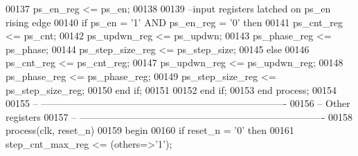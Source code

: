 \begin{DoxyCode}
00137          \textcolor{vhdlchar}{ps_en_reg}            \textcolor{vhdlchar}{<=} \textcolor{vhdlchar}{ps_en};
00138          
00139 \textcolor{keyword}{         --input registers latched on ps\_en rising edge}
00140          \textcolor{keywordflow}{if} \textcolor{vhdlchar}{ps_en} \textcolor{vhdlchar}{=} \textcolor{vhdlchar}{'}\textcolor{vhdllogic}{}\textcolor{vhdllogic}{1}\textcolor{vhdlchar}{'} \textcolor{keywordflow}{AND} \textcolor{vhdlchar}{ps_en_reg} \textcolor{vhdlchar}{=} \textcolor{vhdlchar}{'}\textcolor{vhdllogic}{}\textcolor{vhdllogic}{0}\textcolor{vhdlchar}{'} \textcolor{keywordflow}{then} 
00141             \textcolor{vhdlchar}{ps_cnt_reg}        \textcolor{vhdlchar}{<=} \textcolor{vhdlchar}{ps_cnt};
00142             \textcolor{vhdlchar}{ps_updwn_reg}      \textcolor{vhdlchar}{<=} \textcolor{vhdlchar}{ps_updwn};
00143             \textcolor{vhdlchar}{ps_phase_reg}      \textcolor{vhdlchar}{<=} \textcolor{vhdlchar}{ps_phase};
00144             \textcolor{vhdlchar}{ps_step_size_reg}  \textcolor{vhdlchar}{<=} \textcolor{vhdlchar}{ps_step_size};
00145          \textcolor{keywordflow}{else} 
00146             \textcolor{vhdlchar}{ps_cnt_reg}        \textcolor{vhdlchar}{<=} \textcolor{vhdlchar}{ps_cnt_reg};
00147             \textcolor{vhdlchar}{ps_updwn_reg}      \textcolor{vhdlchar}{<=} \textcolor{vhdlchar}{ps_updwn_reg};
00148             \textcolor{vhdlchar}{ps_phase_reg}      \textcolor{vhdlchar}{<=} \textcolor{vhdlchar}{ps_phase_reg};
00149             \textcolor{vhdlchar}{ps_step_size_reg}  \textcolor{vhdlchar}{<=} \textcolor{vhdlchar}{ps_step_size_reg};
00150          \textcolor{keywordflow}{end} \textcolor{keywordflow}{if};
00151          
00152       \textcolor{keywordflow}{end} \textcolor{keywordflow}{if};
00153    \textcolor{keywordflow}{end} \textcolor{keywordflow}{process};
00154    
00155 \textcolor{keyword}{-- ----------------------------------------------------------------------------}
00156 \textcolor{keyword}{-- Other registers}
00157 \textcolor{keyword}{-- ----------------------------------------------------------------------------}
00158    \textcolor{keywordflow}{process}(clk, reset_n)
00159 \textcolor{vhdlkeyword}{   begin}
00160       \textcolor{keywordflow}{if} \textcolor{vhdlchar}{reset_n} \textcolor{vhdlchar}{=} \textcolor{vhdlchar}{'}\textcolor{vhdllogic}{}\textcolor{vhdllogic}{0}\textcolor{vhdlchar}{'} \textcolor{keywordflow}{then}
00161          \textcolor{vhdlchar}{step_cnt_max_reg} \textcolor{vhdlchar}{<=} \textcolor{vhdlchar}{(}\textcolor{keywordflow}{others}\textcolor{vhdlchar}{=}\textcolor{vhdlchar}{>}\textcolor{vhdlchar}{'}\textcolor{vhdllogic}{}\textcolor{vhdllogic}{1}\textcolor{vhdlchar}{'}\textcolor{vhdlchar}{)};

\end{DoxyCode}
